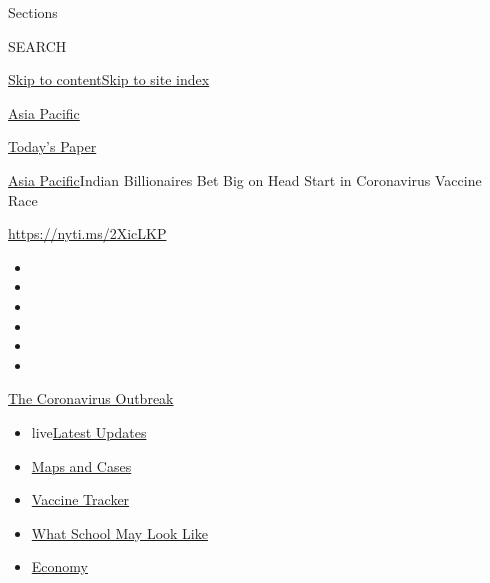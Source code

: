 Sections

SEARCH

\protect\hyperlink{site-content}{Skip to
content}\protect\hyperlink{site-index}{Skip to site index}

\href{https://www.nytimes3xbfgragh.onion/section/world/asia}{Asia
Pacific}

\href{https://myaccount.nytimes3xbfgragh.onion/auth/login?response_type=cookie\&client_id=vi}{}

\href{https://www.nytimes3xbfgragh.onion/section/todayspaper}{Today's
Paper}

\href{/section/world/asia}{Asia Pacific}\textbar{}Indian Billionaires
Bet Big on Head Start in Coronavirus Vaccine Race

\url{https://nyti.ms/2XicLKP}

\begin{itemize}
\item
\item
\item
\item
\item
\item
\end{itemize}

\href{https://www.nytimes3xbfgragh.onion/news-event/coronavirus?action=click\&pgtype=Article\&state=default\&region=TOP_BANNER\&context=storylines_menu}{The
Coronavirus Outbreak}

\begin{itemize}
\tightlist
\item
  live\href{https://www.nytimes3xbfgragh.onion/2020/08/02/world/coronavirus-updates.html?action=click\&pgtype=Article\&state=default\&region=TOP_BANNER\&context=storylines_menu}{Latest
  Updates}
\item
  \href{https://www.nytimes3xbfgragh.onion/interactive/2020/us/coronavirus-us-cases.html?action=click\&pgtype=Article\&state=default\&region=TOP_BANNER\&context=storylines_menu}{Maps
  and Cases}
\item
  \href{https://www.nytimes3xbfgragh.onion/interactive/2020/science/coronavirus-vaccine-tracker.html?action=click\&pgtype=Article\&state=default\&region=TOP_BANNER\&context=storylines_menu}{Vaccine
  Tracker}
\item
  \href{https://www.nytimes3xbfgragh.onion/interactive/2020/07/29/us/schools-reopening-coronavirus.html?action=click\&pgtype=Article\&state=default\&region=TOP_BANNER\&context=storylines_menu}{What
  School May Look Like}
\item
  \href{https://www.nytimes3xbfgragh.onion/live/2020/07/31/business/stock-market-today-coronavirus?action=click\&pgtype=Article\&state=default\&region=TOP_BANNER\&context=storylines_menu}{Economy}
\end{itemize}

